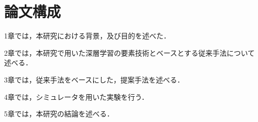 

\section{論文構成}
1章では，本研究における背景，及び目的を述べた．

2章では，本研究で用いた深層学習の要素技術とベースとする従来手法について述べる．

3章では，従来手法をベースにした，提案手法を述べる．

4章では，シミュレータを用いた実験を行う．

5章では，本研究の結論を述べる．
